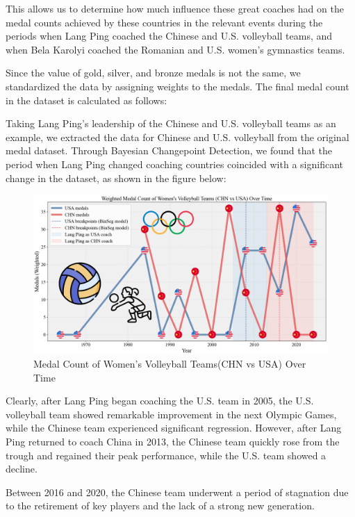 \documentclass[12pt]{article}  %
\begin{document}
This allows us to determine how much influence these great coaches had on the medal counts achieved by these countries in the relevant events during the periods when Lang Ping coached the Chinese and U.S. volleyball teams, and when Bela Karolyi coached the Romanian and U.S. women's gymnastics teams.

Since the value of gold, silver, and bronze medals is not the same, we standardized the data by assigning weights to the medals. The final medal count in the dataset is calculated as follows: 







Taking Lang Ping's leadership of the Chinese and U.S. volleyball teams as an example, we extracted the data for Chinese and U.S. volleyball from the original medal dataset. Through Bayesian Changepoint Detection, we found that the period when Lang Ping changed coaching countries coincided with a significant change in the dataset, as shown in the figure below:



\begin{figure}[H]
	\centering
	\includegraphics[width=12cm]{img/Volleyball.png}
	\caption{Medal Count of Women's Volleyball Teams(CHN vs USA) Over Time}
	\label{fig:aa}
\end{figure}
Clearly, after Lang Ping began coaching the U.S. team in 2005, the U.S. volleyball team showed remarkable improvement in the next Olympic Games, while the Chinese team experienced significant regression. However, after Lang Ping returned to coach China in 2013, the Chinese team quickly rose from the trough and regained their peak performance, while the U.S. team showed a decline.

Between 2016 and 2020, the Chinese team underwent a period of stagnation due to the retirement of key players and the lack of a strong new generation.
\end{document}
